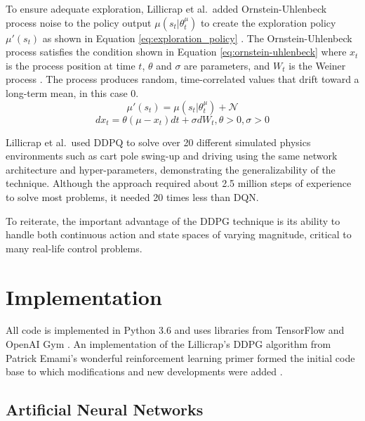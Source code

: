 To ensure adequate exploration, Lillicrap et al.\ added Ornstein-Uhlenbeck process noise to the policy output $\mu(s_t | \theta^\mu_t)$ to create the exploration policy $\mu'(s_t)$ as shown in Equation \ref{eq:exploration_policy} \cite{lillicrap_2016}. The Ornstein-Uhlenbeck process satisfies the condition shown in Equation \ref{eq:ornstein-uhlenbeck} where $x_t$ is the process position at time $t$, $\theta$ and $\sigma$ are parameters, and $W_t$ is the Weiner process \cite{uhlenbeck_ornstein}. The process produces random, time-correlated values that drift toward a long-term mean, in this case 0.
\begin{equation}
\label{eq:exploration_policy}
\mu'(s_t) = \mu(s_t | \theta^\mu_t) + \mathcal{N}
\end{equation}
\begin{equation}
\label{eq:ornstein-uhlenbeck}
dx_t = \theta(\mu-x_t) dt + \sigma dW_t, \theta>0, \sigma>0
\end{equation}

Lillicrap et al.\ used DDPQ to solve over 20 different simulated physics environments such as cart pole swing-up and driving using the same network architecture and hyper-parameters, demonstrating the generalizability of the technique. Although the approach required about 2.5 million steps of experience to solve most problems, it needed 20 times less than DQN. 

To reiterate, the important advantage of the DDPG technique is its ability to handle both continuous action and state spaces of varying magnitude, critical to many real-life control problems. 

\section{Implementation}
All code is implemented in Python 3.6 and uses libraries from TensorFlow \cite{tensorflow} and OpenAI Gym \cite{openaigym}. An implementation of the Lillicrap's DDPG algorithm from Patrick Emami's wonderful reinforcement learning primer formed the initial code base to which modifications and new developments were added \cite{emami_2016}.

\subsection{Artificial Neural Networks}
